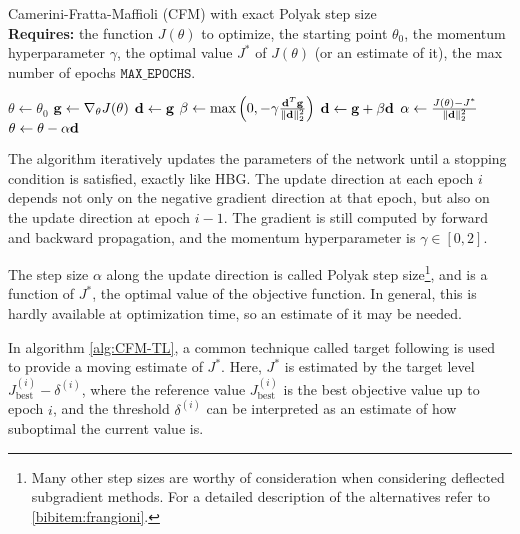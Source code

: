 \begin{algorithm}[htbp]
    \caption{Camerini-Fratta-Maffioli (CFM) with exact Polyak step size\\
        \textbf{Requires:} the function $J(\theta)$ to optimize, the starting point $\theta_0$, the momentum hyperparameter $\gamma$, the optimal value $J^*$ of $J(\theta)$ (or an estimate of it), the max number of epochs $\texttt{MAX\_EPOCHS}$.
    }
    \label{alg:CFM}
    \begin{algorithmic}
        \State $\theta \gets \theta_0$
            \State $\mathbf{g} \gets \nabla_\theta J(\theta)$
                \State $\mathbf{d} \gets \mathbf{g}$
            \Else
                \State $\beta \gets \text{max}\left(0, -\gamma\frac{\mathbf{d}^T\mathbf{g}}{\Vert\mathbf{d}\Vert_2^2}\right)$
                \State $\mathbf{d} \gets \mathbf{g}+\beta\mathbf{d}$
            \EndIf
            \State $\alpha \gets \frac{J(\theta) - J^*}{\Vert\mathbf{d}\Vert_2^2}$
            \State $\theta \gets \theta - \alpha\mathbf{d}$
        \EndFor
    \end{algorithmic}
\end{algorithm}

The algorithm iteratively updates the parameters of the network until a stopping condition is satisfied, exactly like HBG. The update direction at each epoch $i$ depends not only on the negative gradient direction at that epoch, but also on the update direction at epoch $i - 1$. The gradient is still computed by forward and backward propagation, and the momentum hyperparameter is $\gamma \in [0,2]$.

The step size $\alpha$ along the update direction is called Polyak step size\footnote{Many other step sizes are worthy of consideration when considering deflected subgradient methods. For a detailed description of the alternatives refer to \ref{bibitem:frangioni}.}, and is a function of $J^*$, the optimal value of the objective function. In general, this is hardly available at optimization time, so an estimate of it may be needed.

In algorithm \ref{alg:CFM-TL}, a common technique called target following is used to provide a moving estimate of $J^*$. Here, $J^*$ is estimated by the target level $J_{\text{best}}^{(i)} - \delta^{(i)}$, where the reference value $J_{\text{best}}^{(i)}$ is the best objective value up to epoch $i$, and the threshold $\delta^{(i)}$ can be interpreted as an estimate of how suboptimal the current value is.

